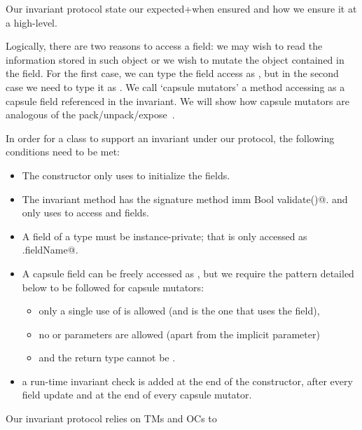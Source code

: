 Our invariant protocol 
state our expected+when ensured%
and how we ensure it at a high-level.


Logically, there are two reasons to access a field: we may wish to read the information stored in such object or we wish to mutate the object contained in the field.
For the first case, we can type the field access as \Q@read@, but in the second case we
need to type it as \Q@mut@. 
We call `capsule mutators' a method accessing as \Q@mut@ a capsule field referenced in the invariant.
We will show how capsule mutators are analogous of the pack/unpack/expose~\cite{???}.


In order for a class to support an invariant under our protocol, the following conditions need to be met:
\begin{itemize}
	\item The constructor only uses \Q@this@ to initialize the fields.
	\item The invariant method has the signature \Q@read method imm Bool validate()@.
	and only uses \Q@this@ to access \Q@imm@ and \Q@capsule@ fields.
	\item A field of a \Q@capsule@ type must be instance-private; that is only accessed as \Q@this.fieldName@.
    \item A capsule field can be freely accessed as \Q@read@, but 
    we require the pattern detailed below to be followed for capsule mutators:
    \begin{itemize}
  	  \item only a single use of \Q@this@ is allowed (and is the one that uses the field),
      \item no \Q@mut@ or \Q@read@ parameters are allowed (apart from the implicit \Q@this@ parameter)
      \item and the return type cannot be \Q@mut@.
    \end{itemize}
    \item a run-time invariant check is added at the end of the constructor, after every field update and at the end of every capsule mutator.
\end{itemize}


\LINE
Our invariant protocol relies on TMs and OCs to



